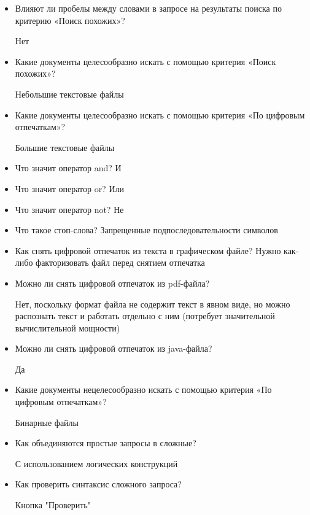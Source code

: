 \begin{itemize}
  \item Влияют ли пробелы между словами в запросе на результаты поиска по
    критерию «Поиск похожих»?

    Нет 

  \item Какие документы целесообразно искать с помощью критерия «Поиск
    похожих»?

    Небольшие текстовые файлы

  \item Какие документы целесообразно искать с помощью критерия «По цифровым
    отпечаткам»?

    Большие текстовые файлы

  \item Что значит оператор and?
    И
  \item Что значит оператор or?
    Или
  \item Что значит оператор not?
    Не
  \item Что такое стоп-слова? 
    Запрещенные подпоследовательности символов

  \item Как снять цифровой отпечаток из текста в графическом файле?
    Нужно как-либо факторизовать файл перед снятием отпечатка

  \item Можно ли снять цифровой отпечаток из pdf-файла?

    Нет, поскольку формат файла не содержит текст в явном виде, но можно
    распознать текст и работать отдельно с ним (потребует значительной
    вычислительной мощности)

  \item Можно ли снять цифровой отпечаток из java-файла? 

    Да

  \item Какие документы нецелесообразно искать с помощью критерия «По цифровым
    отпечаткам»? 

    Бинарные файлы

  \item Как объединяются простые запросы в сложные?
     
    С использованием логических конструкций

  \item Как проверить синтаксис сложного запроса? 

    Кнопка "Проверить"

\end{itemize}


